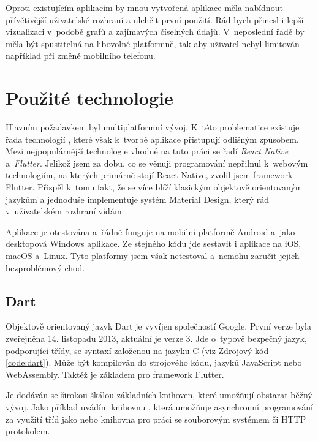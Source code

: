 \documentclass[
  biblatex,
  figures=true,
  tables=false,
  glossaries,
  index
]{kidiplom}
\begin{document}
Oproti existujícím aplikacím by mnou vytvořená aplikace měla nabídnout přívětivější uživatelské rozhraní a ulehčit první použití. Rád bych přinesl i lepší vizualizaci v~podobě grafů a zajímavých číselných údajů. V~neposlední řadě by měla být spustitelná na libovolné platformně, tak aby uživatel nebyl limitován například při změně mobilního telefonu.

\section{Použité technologie}

Hlavním požadavkem byl multiplatformní vývoj. K~této problematice existuje řada technologií \cite{jetbrains-crossplatform}, které však k~tvorbě aplikace přistupují odlišným způsobem. Mezi nejpopulárnější technologie vhodné na tuto práci se řadí \textit{React Native} a~\textit{Flutter}. Jelikož jsem za dobu, co se věnuji programování nepřilnul k~webovým technologiím, na kterých primárně stojí React Native, zvolil jsem framework Flutter. Přispěl k~tomu fakt, že se více blíží klasickým objektově orientovaným jazykům a jednoduše implementuje systém Material Design, který rád v~uživatelském rozhraní vídám.

Aplikace je otestována a~řádně funguje na mobilní platformě Android a~jako desktopová Windows aplikace. Ze stejného kódu jde sestavit i aplikace na iOS, macOS a~Linux. Tyto platformy jsem však netestoval a~nemohu zaručit jejich bezproblémový chod.

\subsection{Dart}
Objektově orientovaný jazyk Dart \cite{dart} je vyvíjen společností Google. První verze byla zveřejněna 14. listopadu 2013, aktuální je verze 3. Jde o~typově bezpečný jazyk, podporující třídy, se syntaxí založenou na jazyku C (viz \hyperref[code:dart]{Zdrojový kód \ref{code:dart}}). Může být kompilován do strojového kódu, jazyků JavaScript nebo WebAssembly. Taktéž je základem pro framework Flutter.

Je dodáván se širokou škálou základních knihoven, které umožňují obstarat běžný vývoj. Jako příklad uvádím knihovnu , která umožňuje asynchronní programování za využití tříd jako  nebo knihovna  pro práci se souborovým systémem či HTTP protokolem.
\end{document}
